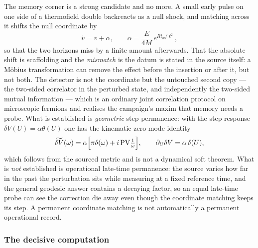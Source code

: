 The memory corner is a strong candidate and no more. A small early pulse on one
side of a thermofield double backreacts as a null shock, and matching across it
shifts the null coordinate by
\begin{equation}
  \tilde v=v+\alpha,\qquad \alpha=\frac{E}{4M}\,e^{R t_w/\ell^2},
  \label{eq:op-shock-shift}
\end{equation}
so that the two horizons miss by a finite amount afterwards. That the absolute
shift is scaffolding and the \emph{mismatch} is the datum is stated in the
source itself: a M\"obius transformation can remove the effect before the
insertion or after it, but not both. The detector is not the coordinate but the
untouched second copy --- the two-sided correlator in the perturbed state, and
independently the two-sided mutual information --- which is an ordinary joint
correlation protocol on microscopic fermions and realises the campaign's maxim
that memory needs a probe. What is established is \emph{geometric} step
permanence: with the step response $\delta V(U)=\alpha\theta(U)$ one has the
kinematic zero-mode identity
\begin{equation}
  \widetilde{\delta V}(\omega)
  =\alpha\Bigl[\pi\delta(\omega)+i\,\mathrm{PV}\tfrac{1}{\omega}\Bigr],
  \qquad
  \partial_U\delta V=\alpha\,\delta(U),
  \label{eq:op-shock-dc}
\end{equation}
which follows from the sourced metric and is not a dynamical soft theorem. What
is \emph{not} established is operational late-time permanence: the source varies
how far in the past the perturbation sits while measuring at a fixed reference
time, and the general geodesic answer contains a decaying factor, so an equal
late-time probe can see the correction die away even though the coordinate
matching keeps its step. A permanent coordinate matching is not automatically a
permanent operational record.

\subsubsection*{The decisive computation}

